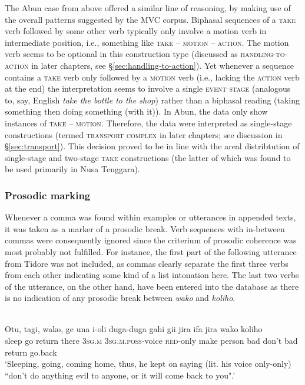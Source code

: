 The Abun case from above offered a similar line of reasoning, by making use of the overall patterns suggested by the MVC corpus. Biphasal sequences of a \textsc{take} verb followed by some other verb typically only involve a motion verb in intermediate position, i.e., something like \textsc{take} -- \textsc{motion} -- \textsc{action}. The motion verb seems to be optional in this construction type (discussed as \textsc{handling-to-action} in later chapters, see §\ref{sec:handling-to-action}). Yet whenever a sequence contains a \textsc{take} verb only followed by a \textsc{motion} verb (i.e., lacking the \textsc{action} verb at the end) the interpretation seems to involve a single \textsc{event stage} (analogous to, say, English \textit{take the bottle to the shop}) rather than a biphasal reading (taking something then doing something (with it)). In Abun, the data only show instances of \textsc{take} -- \textsc{motion}. Therefore, the data were interpreted as single-stage constructions (termed \textsc{transport complex} in later chapters; see discussion in §\ref{sec:transport}). This decision proved to be in line with the areal distribtution of single-stage and two-stage \textsc{take} constructions (the latter of which was found to be used primarily in Nusa Tenggara). 

\subsubsection{Prosodic marking}

Whenever a comma was found within examples or utterances in appended texts, it was taken as a marker of a prosodic break. Verb sequences with in-between commas were consequently ignored since the criterium of prosodic coherence was most probably not fulfilled. For instance, the first part of the following utterance from Tidore was not included, as commas clearly separate the first three verbs from each other indicating some kind of a list intonation here. The last two verbs of the utterance, on the other hand, have been entered into the database as there is no indication of any prosodic break between \textit{wako} and \textit{koliho}.

\ea 
{}\\
\gll Otu, tagi, wako, ge una i-oli duga-duga gahi gii jira ifa jira wako koliho \\
sleep go return there 3\textsc{sg}.\textsc{m} 3\textsc{sg}.\textsc{m}.\textsc{poss}-voice \textsc{red}-only make person bad don't bad return go.back \\
\glft `Sleeping, going, coming home, thus, he kept on saying (lit. his voice only-only) ``don’t
do anything evil to anyone, or it will come back to you".’\\ 
\z

